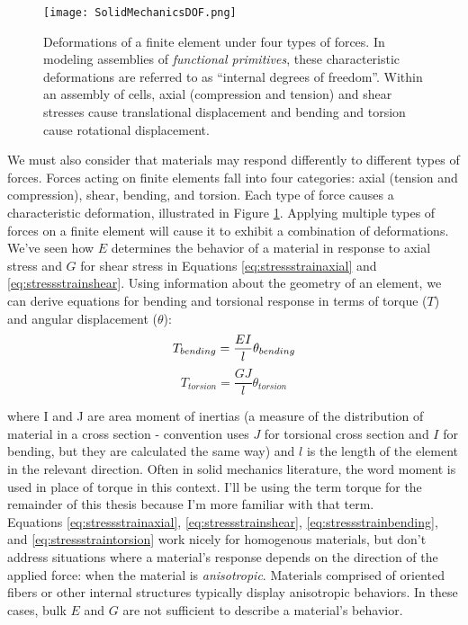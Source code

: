 {\begin{figure}
  \texttt{[image: SolidMechanicsDOF.png]}
  \caption{Deformations of a finite element under four types of forces.  In modeling assemblies of \textit{functional primitives}, these characteristic deformations are referred to as ``internal degrees of freedom''.  Within an assembly of cells, axial (compression and tension) and shear stresses cause translational displacement and bending and torsion cause rotational displacement.}
  \label{fig:SolidMechanicsDOF}
\end{figure}

We must also consider that materials may respond differently to different types of forces.  Forces acting on finite elements fall into four categories: axial (tension and compression), shear, bending, and torsion.  Each type of force causes a characteristic deformation, illustrated in Figure \ref{fig:SolidMechanicsDOF}.  Applying multiple types of forces on a finite element will cause it to exhibit a combination of deformations.  We've seen how $E$ determines the behavior of a material in response to axial stress and $G$ for shear stress in Equations \ref{eq:stressstrainaxial} and  \ref{eq:stressstrainshear}.  Using information about the geometry of an element, we can derive equations for bending and torsional response in terms of torque ($T$) and angular displacement ($\theta$):
\begin{equation}\label{eq:stressstrainbending}
T_{bending} = \dfrac{EI}{l}\theta_{bending}\\[10pt]
\end{equation}
\begin{equation}\label{eq:stressstraintorsion}
T_{torsion} = \dfrac{GJ}{l}\theta_{torsion}
\end{equation}

where I and J are area moment of inertias (a measure of the distribution of material in a cross section - convention uses $J$ for torsional cross section and $I$ for bending, but they are calculated the same way) and $l$ is the length of the element in the relevant direction.  Often in solid mechanics literature, the word moment is used in place of torque in this context.  I'll be using the term torque for the remainder of this thesis because I'm more familiar with that term.\\

Equations \ref{eq:stressstrainaxial}, \ref{eq:stressstrainshear}, \ref{eq:stressstrainbending}, and \ref{eq:stressstraintorsion} work nicely for homogenous materials, but don't address situations where a material's response depends on the direction of the applied force: when the material is \textit{anisotropic}.  Materials comprised of oriented fibers or other internal structures typically display anisotropic behaviors.  In these cases, bulk $E$ and $G$ are not sufficient to describe a material's behavior.

}
